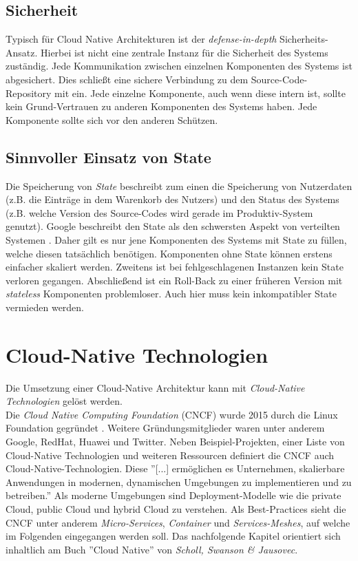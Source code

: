 \subsection{Sicherheit}
Typisch für Cloud Native Architekturen ist der \textit{defense-in-depth} Sicherheits-Ansatz. Hierbei ist nicht eine zentrale Instanz für die Sicherheit des Systems zuständig. Jede Kommunikation zwischen einzelnen Komponenten des Systems ist abgesichert. Dies schließt eine sichere Verbindung zu dem Source-Code-Repository mit ein. Jede einzelne Komponente, auch wenn diese intern ist, sollte kein Grund-Vertrauen zu anderen Komponenten des Systems haben. Jede Komponente sollte sich vor den anderen Schützen.
\subsection{Sinnvoller Einsatz von State}
Die Speicherung von \textit{State} beschreibt zum einen die Speicherung von Nutzerdaten (z.B. die Einträge in dem Warenkorb des Nutzers) und den Status des Systems (z.B. welche Version des Source-Codes wird gerade im Produktiv-System genutzt). Google beschreibt den State als den schwersten Aspekt von verteilten Systemen \cite{tom_grey_5_nodate}. Daher gilt es nur jene Komponenten des Systems mit State zu füllen, welche diesen tatsächlich benötigen. Komponenten ohne State können erstens einfacher skaliert werden. Zweitens ist bei fehlgeschlagenen Instanzen kein State verloren gegangen. Abschließend ist ein Roll-Back zu einer früheren Version mit \textit{stateless} Komponenten problemloser. Auch hier muss kein inkompatibler State vermieden werden. 



\section{Cloud-Native Technologien}
Die Umsetzung einer Cloud-Native Architektur kann mit \textit{Cloud-Native Technologien} gelöst werden.\\ Die \textit{Cloud Native Computing Foundation} (CNCF) wurde 2015 durch die Linux Foundation gegründet \cite{cncf_new_2015}. Weitere Gründungsmitglieder waren unter anderem Google, RedHat, Huawei und Twitter. Neben Beispiel-Projekten, einer Liste von Cloud-Native Technologien und weiteren Ressourcen definiert die CNCF auch Cloud-Native-Technologien. Diese ''[...] ermöglichen es Unternehmen, skalierbare Anwendungen in modernen, dynamischen Umgebungen zu implementieren und zu betreiben.''\cite{cloud_native_computing_foundation_cncftoc_nodate} Als moderne Umgebungen sind Deployment-Modelle wie die private Cloud, public Cloud und hybrid Cloud zu verstehen. Als Best-Practices sieht die CNCF unter anderem \textit{Micro-Services}, \textit{Container} und \textit{Services-Meshes}, auf welche im Folgenden eingegangen werden soll. Das nachfolgende Kapitel orientiert sich inhaltlich am Buch ''Cloud Native'' von \textit{Scholl, Swanson & Jausovec}.

